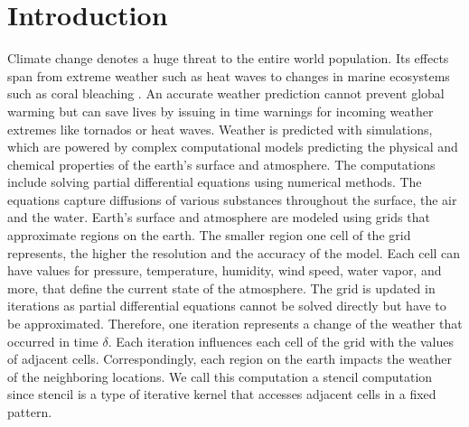 \documentclass[sigplan,\review anonymous]{acmart}
\begin{document}
\else
{} %
\renewcommand\footnotetextcopyrightpermission[1]{} %
\fi

\maketitle
\ifx\grammarly\grammarlyon 
\onecolumn 
\else 
\fi

\section{Introduction}

Climate change denotes a huge threat to the entire world population. Its
effects span from extreme weather such as heat waves \cite{LUBER2008429}
to changes in marine ecosystems \cite{marine} such as coral bleaching
\cite{corals}. An accurate weather prediction cannot prevent global warming
but can save lives by issuing in time warnings for incoming weather extremes
like tornados or heat waves.  Weather is predicted with simulations, which are
powered by complex computational models predicting the physical and chemical
properties of the earth's surface and atmosphere. The computations include
solving partial differential equations using numerical methods. The equations
capture diffusions of various substances throughout the surface, the air and
the water. Earth's surface and atmosphere are modeled using grids that
approximate regions on the earth. The smaller region one cell of the grid
represents, the higher the resolution and the accuracy of the model. Each
cell can have values for pressure, temperature, humidity, wind speed, water
vapor, and more, that define the current state of the atmosphere. The grid
is updated in iterations as partial differential equations cannot be solved
directly but have to be approximated. Therefore, one iteration represents a
change of the weather that occurred in time $\delta$. Each iteration
influences each cell of the grid with the values of adjacent cells.
Correspondingly,
each region on the earth impacts the weather of the neighboring locations.
We call this computation a stencil computation since stencil
\cite{stencilcode} is a type of iterative kernel that accesses adjacent cells
in a fixed pattern. 
\end{document}
